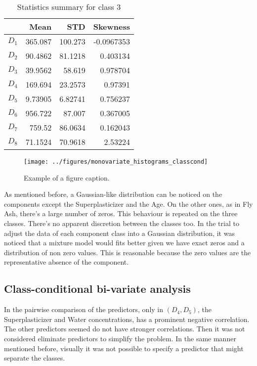 \documentclass[conference]{IEEEtran}
\begin{document}
    \begin{table}[htp]
      \caption{Statistics summary for class 3}
        \centering
        \begin{tabular}{@{} crrr @{}}
          \toprule
           & Mean & STD & Skewness \\ 
          \midrule
          $D_1$ & 365.087  &  100.273  &  -0.0967353 \\ 
          $D_2$ & 90.4862  &  81.1218  &  0.403134 \\ 
          $D_3$ & 39.9562 &   58.619   &  0.978704 \\ 
          $D_4$ & 169.694  &   23.2573  &  0.97391 \\ 
          $D_5$ & 9.73905  &  6.82741  & 0.756237 \\ 
          $D_6$ & 956.722   &  87.007  &   0.367005 \\ 
          $D_7$ & 759.52   &   86.0634  &  0.162043 \\ 
          $D_8$ & 71.1524   & 70.9618  &  2.53224 \\       
          \bottomrule
        \end{tabular}
      \label{Data Statistics Summary}
      \end{table}%


\begin{figure}[htbp]
\centerline{\texttt{[image: ../figures/monovariate\_histograms\_classcond]}}
\caption{Example of a figure caption.}
\label{fig}
\end{figure}

As mentioned before, a Gaussian-like distribution can be noticed on the components except the Superplasticizer and the Age. On the other ones, as in Fly Ash, there's a large number of zeros. This behaviour is repeated on the three classes. There's no apparent discretion between the classes too. In the trial to adjust the data of each component class into a Gaussian distribution, it was noticed that a mixture model would fits better given we have exact zeros and a distribution of non zero values. This is reasonable because the zero values are the representative absence of the component.

\subsection{Class-conditional bi-variate analysis}

In the pairwise comparison of the predictors, only in $(D_4,D_5)$, the Superplasticizer and Water concentrations, has a prominent negative correlation. The other predictors seemed do not have stronger correlations. Then it was not considered eliminate predictors to simplify the problem. In the same manner mentioned before, visually it was not possible to specify a predictor that might separate the classes.
\end{document}
